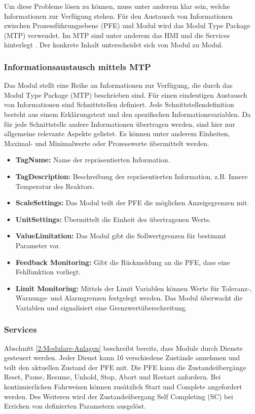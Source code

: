 Um diese Probleme lösen zu können, muss unter anderem klar sein, welche Informationen zur Verfügung stehen. Für den Austausch von Informationen zwischen Prozessführungsebene (PFE) und Modul wird das Modul Type Package (MTP) verwendet. Im MTP sind unter anderem das HMI und die Services hinterlegt \cite{VDI2658-Blatt1}. Der konkrete Inhalt unterscheidet sich von Modul zu Modul.

\subsubsection*{Informationsaustausch mittels MTP}
Das Modul stellt eine Reihe an Informationen zur Verfügung, die durch das Modul Type Package (MTP) beschrieben sind. Für einen eindeutigen Austausch von Informationen sind Schnittstellen definiert. Jede Schnittstellendefinition besteht aus einem Erklärungstext und den spezifischen Informationsvariablen. Da für jede Schnittstelle andere Informationen übertragen werden, sind hier nur allgemeine relevante Aspekte gelistet. Es können unter anderem Einheiten, Maximal- und Minimalwerte oder Prozesswerte übermittelt werden. \cite{VDI2658-Blatt3} 
\begin{itemize}
\item \textbf{TagName:} Name der repräsentierten Information. 
\item \textbf{TagDescription:} Beschreibung der repräsentierten Information, z.B. Innere Temperatur des Reaktors.
\item \textbf{ScaleSettings:} Das Modul teilt der PFE die möglichen Anzeigegrenzen mit.
\item \textbf{UnitSettings:} Übermittelt die Einheit des übertragenen Werts.
\item \textbf{ValueLimitation:} Das Modul gibt die Sollwertgrenzen für bestimmt Parameter vor.
\item \textbf{Feedback Monitoring:} Gibt die Rückmeldung an die PFE, dass eine Fehlfunktion vorliegt.
\item \textbf{Limit Monitoring:} Mittels der Limit Variablen können Werte für Toleranz-, Warnungs- und Alarmgrenzen festgelegt werden. Das Modul überwacht die Variablen und signalisiert eine Grenzwertüberschreitung.
\end{itemize}

\subsubsection*{Services}
Abschnitt \ref{2:Modulare-Anlagen} beschreibt bereits, dass Module durch Dienste gesteuert werden. Jeder Dienst kann 16 verschiedene Zustände annehmen und teilt den aktuellen Zustand der PFE mit. Die PFE kann die Zustandsübergänge Reset, Pause, Resume, Unhold, Stop, Abort und Restart anfordern. Bei kontinuierlichen Fahrweisen können zusätzlich Start und Complete angefordert werden. Des Weiteren wird der Zustandsübergang Self Completing (SC) bei Errichen von definierten Parametern ausgelöst. \cite{Bloch2017}

